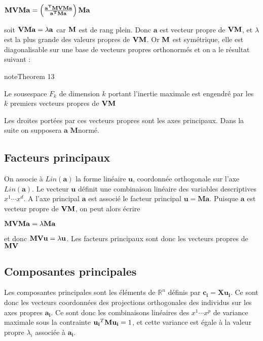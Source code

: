 \documentclass[letterpaper,10pt,english]{jupyterBook}
\begin{document}
\sphinxAtStartPar
\({\bf MVM}\mathbf{a}=\left (\frac{\mathbf{a^T}{\bf MVM}\mathbf{a}}{\mathbf{a^T}{\bf M}\mathbf{a}} \right ){\bf M}\mathbf{a}\)

\sphinxAtStartPar
soit \({\bf VM}\mathbf{a}=\lambda \mathbf{a}\) car \({\bf M}\) est de rang plein. Donc \(\mathbf{a}\) est vecteur propre de \({\bf VM}\), et \(\lambda\) est la plus grande des valeurs propres de \({\bf VM}\). Or \({\bf M}\) est symétrique, elle est diagonalisable sur une base de vecteurs propres orthonormés et on a le résultat suivant :
\label{acp:theorem-1}
\begin{sphinxadmonition}{note}{Theorem 13}



\sphinxAtStartPar
Le sous\sphinxhyphen{}espace \(F_k\) de dimension \(k\) portant l’inertie maximale est engendré par les \(k\) premiers vecteurs propres de \({\bf VM}\)
\end{sphinxadmonition}

\sphinxAtStartPar
Les droites portées par ces vecteurs propres sont les axes principaux. Dans la suite on supposera \(\mathbf{a}\) \(\mathbf M\)\sphinxhyphen{}normé.


\subsection{Facteurs principaux}
\label{\detokenize{acp:facteurs-principaux}}
\ignorespaces 
{}\ignorespaces 
\sphinxAtStartPar
On associe à  \(Lin(\mathbf{a})\) la forme linéaire \(\mathbf{u}\), coordonnée orthogonale sur l’axe \(Lin(\mathbf{a})\). Le vecteur \(\mathbf{u}\) définit une combinaison linéaire des variables descriptives \(x^1\cdots x^d\). A l’axe principal \(\mathbf{a}\) est associé le facteur principal \(\mathbf{u}=\mathbf{Ma}\). Puisque \(\mathbf{a}\) est vecteur propre de \({\bf VM}\), on peut alors écrire

\sphinxAtStartPar
\({\bf MVM}\mathbf{a}=\lambda {\bf M}\mathbf{a}\)

\sphinxAtStartPar
et donc \({\bf MV}\mathbf{u}=\lambda \mathbf{u}\).  Les facteurs principaux sont donc les vecteurs propres de \({\bf MV}\)


\subsection{Composantes principales}
\label{\detokenize{acp:composantes-principales}}
\sphinxAtStartPar
Les composantes principales sont les éléments de \(\mathbb{R}^n\) définis par \(\mathbf{c_i}=\mathbf{Xu_i}\). Ce sont donc les vecteurs coordonnées des projections orthogonales des individus sur les axes propres \(\mathbf{a_i}\).  Ce sont donc les combinaisons linéaires des \(x^1\cdots x^p\) de variance maximale sous la contrainte \(\mathbf{u_i}^T{\bf M}\mathbf{u_i}=1\), et cette variance est égale à la valeur propre \(\lambda_i\) associée à \(\mathbf{a_i}\).
\end{document}
